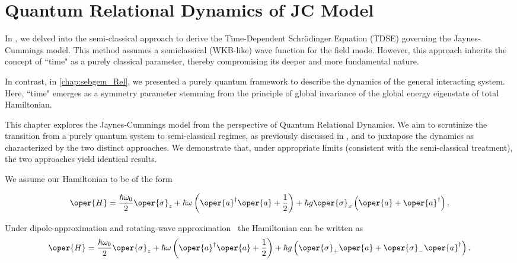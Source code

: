 \chapter{Quantum Relational Dynamics of JC Model
\label{chap5:RDQ_JCM_chap}}

In , we delved into the semi-classical approach to derive the Time-Dependent Schrödinger Equation (TDSE) governing the Jaynes-Cummings model. 
This method assumes a semiclassical (WKB-like) wave function for the field mode. However, 
this approach inherits the concept of ``time" as a purely classical parameter, thereby compromising its deeper and more fundamental nature.

In contrast, in \ref{chap:sebgem_Rel}, we presented a purely quantum framework to describe the dynamics of the general interacting system. Here, ``time" 
emerges as a symmetry parameter stemming from the principle of global invariance of the global energy 
eigenstate of total Hamiltonian.

This chapter explores the Jaynes-Cummings model from the perspective of Quantum Relational Dynamics. 
We aim to scrutinize the transition from a purely quantum system to semi-classical regimes, 
as previously discussed in , and to juxtapose the dynamics as 
characterized by the two distinct approaches. We demonstrate that, under appropriate limits
(consistent with the semi-classical treatment), the two approaches yield identical results. 

We assume our Hamiltonian to be of the form

\begin{eqnarray}
        \label{eq:chap5_JCM_Hamiltonian}
        \oper{H} = \frac{\hbar \omega_0}{2} \oper{\sigma}_z + \hbar \omega \left(\oper{a}^\dagger \oper{a} + \frac{1}{2}\right) 
        + \hbar g \oper{\sigma}_x\left(\oper{a} + \oper{a}^\dagger\right). 
\end{eqnarray}


Under dipole-approximation and rotating-wave approximation~\cite[Chap 2]{Bina_JC_tutorial} the Hamiltonian can be written as
\begin{equation}
        \label{eq:chap5_JCM_Hamiltonian_RWA}
        \oper{H} = \frac{\hbar \omega_0}{2} \oper{\sigma}_z + \hbar \omega \left(\oper{a}^\dagger \oper{a} + \frac{1}{2}\right) 
        + \hbar g \left(\oper{\sigma}_+ \oper{a} + \oper{\sigma}_- \oper{a}^\dagger\right).
\end{equation}

